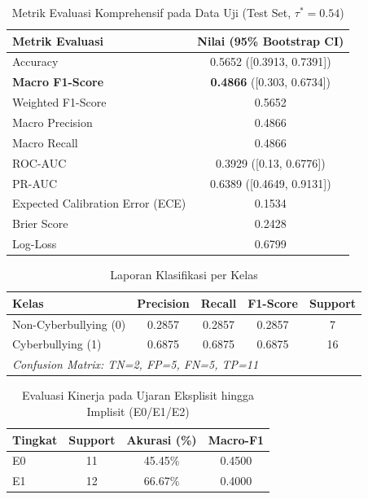 \begin{table}[htbp]
\centering
\caption{Metrik Evaluasi Komprehensif pada Data Uji (Test Set, $\tau^*=0.54$)}
\label{tab:overall_performance}
\begin{tabular}{lc}
\hline
\textbf{Metrik Evaluasi} & \textbf{Nilai (95\% Bootstrap CI)} \\
\hline
Accuracy & 0.5652 ([0.3913, 0.7391]) \\
\textbf{Macro F1-Score} & \textbf{0.4866} ([0.303, 0.6734]) \\
Weighted F1-Score & 0.5652 \\
Macro Precision & 0.4866 \\
Macro Recall & 0.4866 \\
ROC-AUC & 0.3929 ([0.13, 0.6776]) \\
PR-AUC & 0.6389 ([0.4649, 0.9131]) \\
Expected Calibration Error (ECE) & 0.1534 \\
Brier Score & 0.2428 \\
Log-Loss & 0.6799 \\
\hline
\end{tabular}
\end{table}

\begin{table}[htbp]
\centering
\caption{Laporan Klasifikasi per Kelas}
\label{tab:class_report}
\begin{tabular}{lcccc}
\hline
\textbf{Kelas} & \textbf{Precision} & \textbf{Recall} & \textbf{F1-Score} & \textbf{Support} \\
\hline
Non-Cyberbullying (0) & 0.2857 & 0.2857 & 0.2857 & 7 \\
Cyberbullying (1) & 0.6875 & 0.6875 & 0.6875 & 16 \\
\hline
\multicolumn{5}{l}{\footnotesize \textit{Confusion Matrix: TN=2, FP=5, FN=5, TP=11}} \\
\end{tabular}
\end{table}

\begin{table}[htbp]
\centering
\caption{Evaluasi Kinerja pada Ujaran Eksplisit hingga Implisit (E0/E1/E2)}
\label{tab:implicit_analysis}
\begin{tabular}{lccc}
\hline
\textbf{Tingkat} & \textbf{Support} & \textbf{Akurasi (\%)} & \textbf{Macro-F1} \\
\hline
E0 & 11 & 45.45\% & 0.4500 \\
E1 & 12 & 66.67\% & 0.4000 \\
\hline
\end{tabular}
\end{table}

